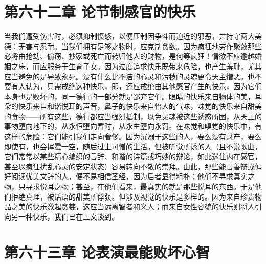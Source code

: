 
\section{第六十二章 论节制感官的快乐}

当我们遭受伤害时，必须抑制愤怒，以便压制因争斗而迫近的邪恶，并持守两大美德：无害与忍耐。当我们拥有足够之物时，应克制贪欲。因为疯狂地劳作聚敛那些必将由抢劫、偷窃、抄家或死亡而转归他人的财物，是何等疯狂！情欲不应逾越婚姻之床，而应服务于生育子女。因为过度追求快乐既带来危险，也产生羞耻，尤其应当避免的是导致永死。没有什么比不洁的心灵和污秽的灵魂更令天主憎恶。也不要有人认为，只需戒绝这种快乐，即，还应戒绝由其他感官产生的快乐，因为它们本身也是败坏的，同一德行的一部分就是鄙弃它们。眼睛的快乐来自物体的美，耳朵的快乐来自和谐悦耳的声音，鼻子的快乐来自怡人的气味，味觉的快乐来自甜美的食物——所有这些，德行都应当强烈抵制，以免灵魂被这些诱惑所困，从天上的事物堕向地下的，从永恒堕向暂时，从永生堕向永罚。在味觉和嗅觉的快乐中，有这样的危险：它们能引我们走向奢侈。因为沉溺于这些的人，要么没有财产，要么即使有，也会挥霍一空，随后过上可憎的生活。但被听觉所诱的人（且不说歌曲，它们常常以某些精心编织的言辞、和谐的诗篇或巧妙的辩论，如此迷住内在感官，甚至以疯狂扰乱心灵的安定状态）容易转向不敬的崇拜。由此，那些能言善辩或偏好阅读优美文辞的人，便不易相信圣经，因为后者显得粗朴；他们不寻求真实之物，只寻求悦耳之物；甚至，在他们看来，最真实的就是那些悦耳的东西。于是他们拒绝真理，被话语的甜美所俘获。但涉及视觉的快乐是多样的。因为来自珍贵物品之美的快乐激起贪婪，这应当远离智者和义人；而来自女性容貌的快乐则将人引向另一种快乐，我们已在上文谈到。\par


\section{第六十三章 论表演最能败坏心智}

